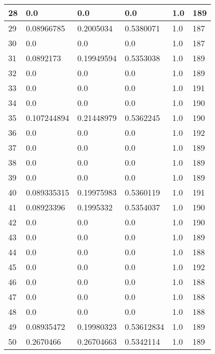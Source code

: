 \begin{longtable}{|l|l|l|l|l|l|}
28 & 0.0 & 0.0 & 0.0 & 1.0 & 189 \\ \hline 
29 & 0.08966785 & 0.2005034 & 0.5380071 & 1.0 & 187 \\ \hline 
30 & 0.0 & 0.0 & 0.0 & 1.0 & 187 \\ \hline 
31 & 0.0892173 & 0.19949594 & 0.5353038 & 1.0 & 189 \\ \hline 
32 & 0.0 & 0.0 & 0.0 & 1.0 & 189 \\ \hline 
33 & 0.0 & 0.0 & 0.0 & 1.0 & 191 \\ \hline 
34 & 0.0 & 0.0 & 0.0 & 1.0 & 190 \\ \hline 
35 & 0.107244894 & 0.21448979 & 0.5362245 & 1.0 & 190 \\ \hline 
36 & 0.0 & 0.0 & 0.0 & 1.0 & 192 \\ \hline 
37 & 0.0 & 0.0 & 0.0 & 1.0 & 189 \\ \hline 
38 & 0.0 & 0.0 & 0.0 & 1.0 & 189 \\ \hline 
39 & 0.0 & 0.0 & 0.0 & 1.0 & 189 \\ \hline 
40 & 0.089335315 & 0.19975983 & 0.5360119 & 1.0 & 191 \\ \hline 
41 & 0.08923396 & 0.1995332 & 0.5354037 & 1.0 & 190 \\ \hline 
42 & 0.0 & 0.0 & 0.0 & 1.0 & 190 \\ \hline 
43 & 0.0 & 0.0 & 0.0 & 1.0 & 189 \\ \hline 
44 & 0.0 & 0.0 & 0.0 & 1.0 & 188 \\ \hline 
45 & 0.0 & 0.0 & 0.0 & 1.0 & 192 \\ \hline 
46 & 0.0 & 0.0 & 0.0 & 1.0 & 188 \\ \hline 
47 & 0.0 & 0.0 & 0.0 & 1.0 & 188 \\ \hline 
48 & 0.0 & 0.0 & 0.0 & 1.0 & 188 \\ \hline 
49 & 0.08935472 & 0.19980323 & 0.53612834 & 1.0 & 189 \\ \hline 
50 & 0.2670466 & 0.26704663 & 0.5342114 & 1.0 & 189 \\ \hline 
\end{longtable}